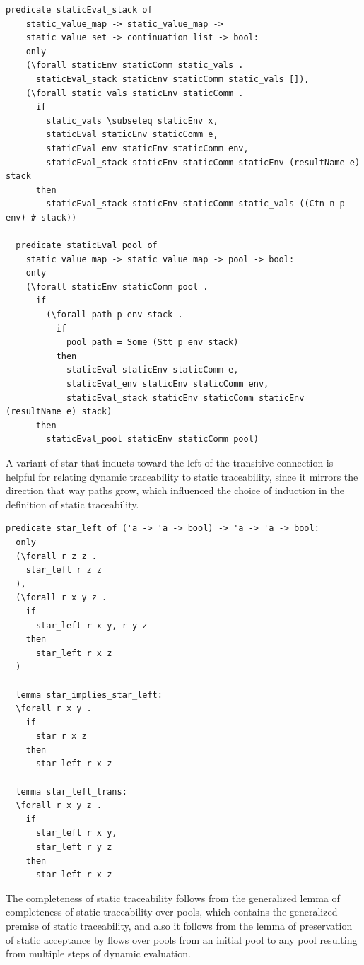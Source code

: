 \documentclass[10pt]{article}
\begin{document}
\begin{lstlisting}[language=logic, mathescape]
  predicate staticEval_stack of
    static_value_map -> static_value_map ->
    static_value set -> continuation list -> bool:
    only 
    (\forall staticEnv staticComm static_vals .
      staticEval_stack staticEnv staticComm static_vals []),
    (\forall static_vals staticEnv staticComm . 
      if 
        static_vals \subseteq staticEnv x,
        staticEval staticEnv staticComm e,
        staticEval_env staticEnv staticComm env,
        staticEval_stack staticEnv staticComm staticEnv (resultName e) stack 
      then
        staticEval_stack staticEnv staticComm static_vals ((Ctn n p env) # stack))

  predicate staticEval_pool of
    static_value_map -> static_value_map -> pool -> bool:
    only
    (\forall staticEnv staticComm pool .
      if
        (\forall path p env stack .
          if
            pool path = Some (Stt p env stack)
          then 
            staticEval staticEnv staticComm e,
            staticEval_env staticEnv staticComm env,
            staticEval_stack staticEnv staticComm staticEnv (resultName e) stack)
      then 
        staticEval_pool staticEnv staticComm pool)
  \end{lstlisting}


A variant of star that inducts toward the left of the transitive connection is helpful for
relating dynamic traceability to static traceability, since it mirrors the direction that way
paths grow, which influenced the choice of induction in the definition of static
traceability.

\begin{lstlisting}[language=logic, mathescape]
  predicate star_left of ('a -> 'a -> bool) -> 'a -> 'a -> bool:
  only
  (\forall r z z .
    star_left r z z
  ),
  (\forall r x y z .
    if
      star_left r x y, r y z
    then
      star_left r x z
  )

  lemma star_implies_star_left:
  \forall r x y .
    if
      star r x z
    then
      star_left r x z

  lemma star_left_trans:
  \forall r x y z .
    if 
      star_left r x y,
      star_left r y z 
    then
      star_left r x z
\end{lstlisting}

The completeness of static traceability follows from the generalized lemma
of completeness of static traceability over pools, which contains
the generalized premise of
static traceability, and also it follows from the lemma of preservation of static
acceptance by flows over pools from an initial pool to any pool resulting from multiple steps of
dynamic evaluation.
\end{document}
